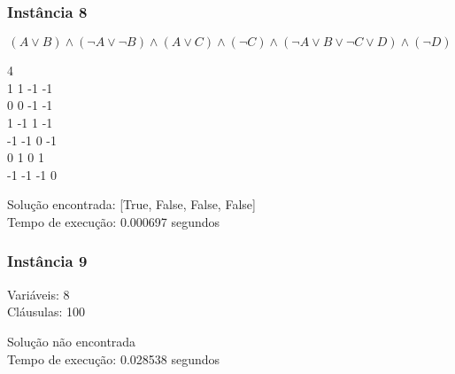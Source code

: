 \documentclass[12pt]{article}
\begin{document}
    \subsubsection{Instância 8}
        \[( A \lor B) \land ( \neg A \lor \neg B) \land ( A \lor C) \land ( \neg C) \land ( \neg A \lor B \lor \neg C \lor D) \land ( \neg D)\]

        \begin{tcolorbox}[title=Entrada da instância 8, width=\linewidth, fontupper=\ttfamily,  halign=flush left]
            4 \\
            1 1 -1 -1 \\
            0 0 -1 -1 \\
            1 -1 1 -1 \\
            -1 -1 0 -1 \\
            0 1 0 1 \\
            -1 -1 -1 0 \\
        \end{tcolorbox}
        \begin{tcolorbox}[title=Saída da instância 8, width=\linewidth, fontupper=\ttfamily, halign=flush left]
            Solução encontrada: [True, False, False, False] \\
            Tempo de execução: 0.000697 segundos
        \end{tcolorbox}
    \subsubsection{Instância 9}
        \begin{tcolorbox}[title=Entrada da instância 9, width=\linewidth, fontupper=\ttfamily,  halign=flush left]
            Variáveis: 8 \\
            Cláusulas: 100
        \end{tcolorbox}
        \begin{tcolorbox}[title=Saída da instância 9, width=\linewidth, fontupper=\ttfamily, halign=flush left]
            Solução não encontrada \\
            Tempo de execução: 0.028538 segundos
        \end{tcolorbox}
\end{document}
